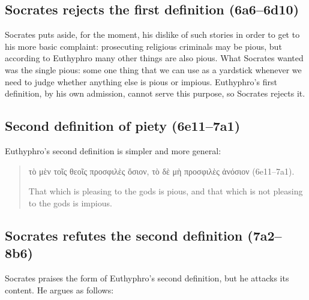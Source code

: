 \documentclass[11pt]{article}
\begin{document}
\subsection{Socrates rejects the first definition (6a6--6d10)}

Socrates puts aside, for the moment, his dislike of such stories in order to get to his more basic complaint: prosecuting religious criminals may be pious, but according to Euthyphro many other things are also pious.  What Socrates wanted was the single pious: some one thing that we can use as a yardstick whenever we need to judge whether anything else is pious or impious.  Euthyphro's first definition, by his own admission, cannot serve this purpose, so Socrates rejects it.

\subsection{Second definition of piety (6e11--7a1)}

Euthyphro's second definition is simpler and more general:

\begin{quote}
    τὸ μὲν τοῖς θεοῖς προσφιλὲς ὅσιον, τὸ δὲ μὴ προσφιλὲς ἀνόσιον (6e11--7a1).

    That which is pleasing to the gods is pious, and that which is not pleasing to the gods is impious.
\end{quote}

\subsection{Socrates refutes the second definition (7a2--8b6)}

Socrates praises the form of Euthyphro's second definition, but he attacks its content.  He argues as follows:
\end{document}
